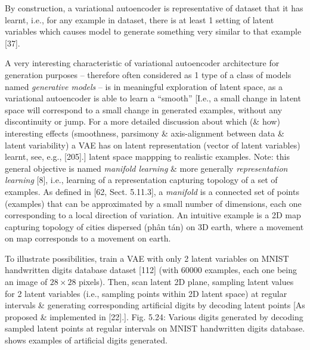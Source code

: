 \documentclass{article}
\begin{document}
\begin{itemize}
\begin{itemize}
\begin{itemize}
			By construction, a variational autoencoder is representative of dataset that it has learnt, i.e., for any example in dataset, there is at least 1 setting of latent variables which causes model to generate something very similar to that example [37].
			
			A very interesting characteristic of variational autoencoder architecture for generation purposes -- therefore often considered as 1 type of a class of models named {\it generative models} -- is in meaningful exploration of latent space, as a variational autoencoder is able to learn a ``smooth'' [I.e., a small change in latent space will correspond to a small change in generated examples, without any discontinuity or jump. For a more detailed discussion about which (\& how) interesting effects (smoothness, parsimony \& axis-alignment between data \& latent variability) a VAE has on latent representation (vector of latent variables) learnt, see, e.g., [205].] latent space mappping to realistic examples. Note: this general objective is named {\it manifold learning} \& more generally {\it representation learning} [8], i.e., learning of a representation capturing topology of a set of examples. As defined in [62, Sect. 5.11.3], a {\it manifold} is a connected set of points (examples) that can be approximated by a small number of dimensions, each one corresponding to a local direction of variation. An intuitive example is a 2D map capturing topology of cities dispersed (phân tán) on 3D earth, where a movement on map corresponds to a movement on earth.
			
			To illustrate possibilities, train a VAE with only 2 latent variables on MNIST handwritten digits database dataset [112] (with 60000 examples, each one being an image of $28\times28$ pixels). Then, scan latent 2D plane, sampling latent values for 2 latent variables (i.e., sampling points within 2D latent space) at regular intervals \& generating corresponding artificial digits by decoding latent points [As proposed \& implemented in [22].]. {\sf Fig. 5.24: Various digits generated by decoding sampled latent points at regular intervals on MNIST handwritten digits database.} shows examples of artificial digits generated.
			

\end{itemize}
\end{itemize}
\end{itemize}
\end{document}
